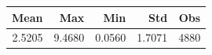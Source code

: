 \begin{tabular}{rrrrr}
\toprule
Mean & Max & Min & Std & Obs \\
\midrule
2.5205 & 9.4680 & 0.0560 & 1.7071 & 4880 \\
\bottomrule
\end{tabular}
